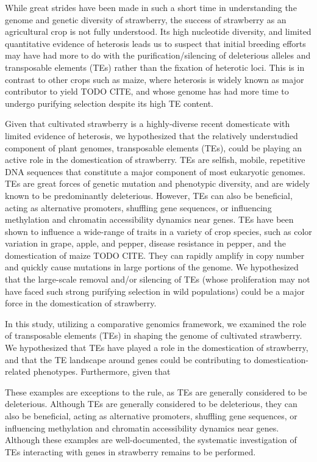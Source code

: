 \documentclass[fleqn,10pt]{olplainarticle}
\begin{document}
While great strides have been made in such a short time in understanding the genome and genetic diversity of strawberry, the success of strawberry as an agricultural crop is not fully understood.
Its high nucleotide diversity, and limited quantitative evidence of heterosis \cite{Stegmeir2010, Rho2012, Hardigan2020} leads us to suspect that initial breeding efforts may have had more to do with the purification/silencing of deleterious alleles and transposable elements (TEs) rather than the fixation of heterotic loci.
This is in contrast to other crops such as maize, where heterosis is widely known as major contributor to yield TODO CITE, and whose genome has had more time to undergo purifying selection despite its high TE content.


Given that cultivated strawberry is a highly-diverse recent domesticate with limited evidence of heterosis, we hypothesized that the relatively understudied component of plant genomes, transposable elements (TEs), could be playing an active role in the domestication of strawberry.
TEs are selfish, mobile, repetitive DNA sequences that constitute a major component of most eukaryotic genomes.
TEs are great forces of genetic mutation and phenotypic diversity, and are widely known to be predominantly deleterious.
However, TEs can also be beneficial, acting as alternative promoters, shuffling gene sequences, or influencing methylation and chromatin accessibility dynamics near genes.
TEs have been shown to influence a wide-range of traits in a variety of crop species, such as color variation in grape, apple, and pepper, disease resistance in pepper, and the domestication of maize TODO CITE.
They can rapidly amplify in copy number and quickly cause mutations in large portions of the genome.
We hypothesized that the large-scale removal and/or silencing of TEs (whose proliferation may not have faced such strong purifying selection in wild populations) could be a major force in the domestication of strawberry.






In this study, utilizing a comparative genomics framework, we examined the role of transposable elements (TEs) in shaping the genome of cultivated strawberry.
We hypothesized that TEs have played a role in the domestication of strawberry, and that the TE landscape around genes could be contributing to domestication-related phenotypes.
Furthermore, given that 



These examples are exceptions to the rule, as TEs are generally considered to be deleterious.
Although TEs are generally considered to be deleterious, they can also be beneficial, acting as alternative promoters, shuffling gene sequences, or influencing methylation and chromatin accessibility dynamics near genes.
Although these examples are well-documented, the systematic investigation of TEs interacting with genes in strawberry remains to be performed.
\end{document}
